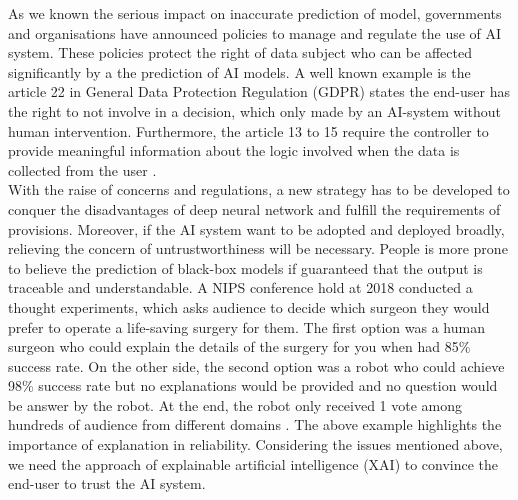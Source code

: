 As we known the serious impact on inaccurate prediction of model, governments and organisations have announced policies to manage and regulate the use of AI system. These policies protect the right of data subject who can be affected significantly by a the prediction of AI models. A well known example is the article 22 in General Data Protection Regulation (GDPR) states the end-user has the right to not involve in a decision, which only made by an AI-system without human intervention. Furthermore, the article 13 to 15 require the controller to provide meaningful information about the logic involved when the data is collected from the user \citep{EU2018GDPR}. \\

With the raise of concerns and regulations, a new strategy has to be developed to conquer the disadvantages of deep neural network and fulfill the requirements of provisions. Moreover, if the AI system want to be adopted and deployed broadly, relieving  the concern of untrustworthiness will be necessary. People is more prone to believe the prediction of black-box models if guaranteed that the output is traceable and understandable. A NIPS conference hold at 2018 conducted a thought experiments, which asks audience to decide which surgeon they would prefer to operate a life-saving surgery for them. The first option was a human surgeon who could explain the details of the surgery for you when had 85\% success rate. On the other side, the second option was a robot who could achieve 98\% success rate but no explanations would be provided and no question would be answer by the robot. At the end, the robot only received 1 vote among hundreds of audience from different domains \citep{Rudin2019LessonFromAICompetition}. The above example highlights the importance of explanation in reliability. Considering the issues mentioned above, we need the approach of explainable artificial intelligence (XAI) to convince the end-user to trust the AI system. \\

